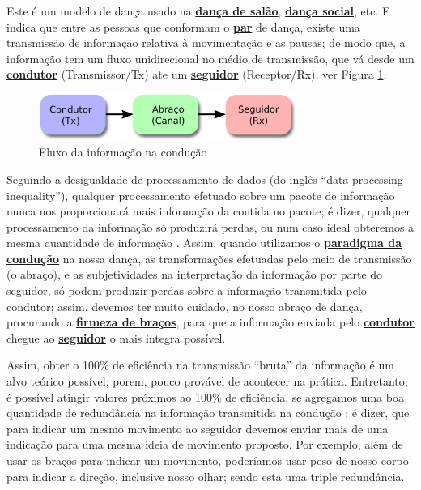\begin{definition} 
\label{def:ParadigmaConducao} 
Este é um modelo de dança usado na \hyperref[def:DancaSalao]{\textbf{dança de salão}},
\hyperref[def:DancaSocial]{\textbf{dança social}}, etc. 
E indica que entre as pessoas que conformam o \hyperref[def:Par]{\textbf{par}} de dança,
existe uma transmissão de informação relativa à movimentação e as pausas; 
de modo que, a informação tem um fluxo unidirecional no médio de transmissão,
que vá desde um \hyperref[def:Condutor]{\textbf{condutor}} (Transmissor/Tx) 
ate um \hyperref[def:Seguidor]{\textbf{seguidor}} (Receptor/Rx),
ver Figura \ref{fig:paradigmaconducion}. 
\end{definition}

\begin{figure}[!ht]
     \centering
\includegraphics[width=0.75\textwidth]{chapters/cap-normas/modeloconducao.eps}
\caption{Fluxo da informação na condução}
\label{fig:paradigmaconducion}
\end{figure}

Seguindo a desigualdade de processamento de dados (do inglês ``data-processing inequality''),
qualquer processamento efetuado sobre um pacote de informação 
nunca nos proporcionará mais informação da contida no pacote;
é dizer, qualquer processamento da informação só produzirá perdas,
ou num caso ideal obteremos a mesma quantidade de informação  \cite[pp. 34]{cover2006elements}.
Assim, quando utilizamos o \hyperref[def:ParadigmaConducao]{\textbf{paradigma da condução}} na nossa dança,
as transformações efetuadas pelo meio de transmissão (o abraço),
e as subjetividades na interpretação da informação por parte do seguidor, 
só podem produzir perdas sobre a informação transmitida pelo condutor;
assim, devemos ter muito cuidado, no nosso abraço de dança,
procurando a \hyperref[def:brazosfirmes]{\textbf{firmeza de braços}}, 
para que a informação enviada pelo \hyperref[def:Condutor]{\textbf{condutor}} 
chegue ao \hyperref[def:Seguidor]{\textbf{seguidor}} o mais integra possível.

Assim, obter o 100\% de eficiência na transmissão ``bruta'' da informação
é  um alvo teórico possível; porem, pouco provável de acontecer na prática.
Entretanto, é possível atingir valores próximos ao 100\% de eficiência,
se agregamos uma boa quantidade de redundância na informação transmitida na condução \cite[pp. 184,219]{cover2006elements};
é dizer, que para indicar um mesmo movimento ao seguidor devemos enviar mais de uma indicação 
para uma mesma ideia de movimento proposto. Por exemplo, 
além de usar os braços para indicar um movimento, 
poderíamos usar peso de nosso corpo para indicar a direção, inclusive nosso olhar;
sendo esta uma triple redundância.
 

